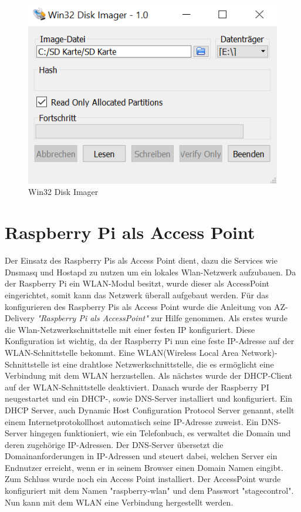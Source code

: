 \begin{figure}[H]
	\centering
	\includegraphics[width=0.5\linewidth]{images/Win32 Disk Imager.png}
	\caption[Win32 Disk Imager]{Win32 Disk Imager}
	\label{fig:Win32 Disk Imager}
\end{figure}

\section{Raspberry Pi als Access Point}
Der Einsatz des Raspberry Pis als Access Point dient, dazu die Services wie Dnsmasq und Hostapd zu nutzen um ein lokales Wlan-Netzwerk aufzubauen. Da der Raspberry Pi ein WLAN-Modul besitzt, wurde dieser als AccessPoint eingerichtet, somit kann das Netzwerk überall aufgebaut werden.  
Für das konfigurieren des Raspberry Pis als Access Point wurde die Anleitung von AZ-Delivery \textit{"Raspberry Pi als AccessPoint"} zur Hilfe genommen. Als erstes wurde die Wlan-Netzwerkschnittstelle mit einer festen IP konfiguriert. Diese Konfiguration ist wichtig, da der Raspberry Pi nun eine feste IP-Adresse auf der WLAN-Schnittstelle bekommt. Eine WLAN(Wireless Local Area Network)-Schnittstelle ist eine drahtlose Netzwerkschnittstelle, die es ermöglicht eine Verbindung mit dem WLAN herzustellen. Als nächstes wurde der DHCP-Client auf der WLAN-Schnittstelle deaktiviert.  Danach wurde der Raspberry PI neugestartet und ein DHCP-, sowie DNS-Server installiert und konfiguriert. Ein DHCP Server, auch Dynamic Host Configuration Protocol Server genannt, stellt einem Internetprotokollhost automatisch seine IP-Adresse zuweist. Ein DNS-Server hingegen funktioniert, wie ein Telefonbuch, es verwaltet die Domain und deren zugehörige IP-Adressen. Der DNS-Server übersetzt die Domainanforderungen in IP-Adressen und steuert dabei, welchen Server ein Endnutzer erreicht, wenn er in seinem Browser einen Domain Namen eingibt.  Zum Schluss wurde noch ein Access Point installiert. Der AccessPoint wurde konfiguriert mit dem Namen "raspberry-wlan" und dem Passwort "stagecontrol". Nun kann mit dem WLAN eine Verbindung hergestellt werden. \parencite{RaspberryPiAccessPoint}


